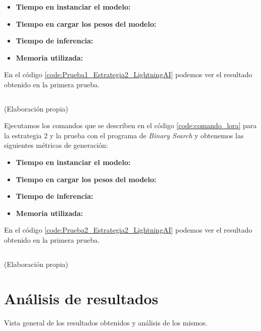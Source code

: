 \begin{itemize}
    \item \textbf{Tiempo en instanciar el modelo:}
    \item \textbf{Tiempo en cargar los pesos del modelo:}
    \item \textbf{Tiempo de inferencia:}
    \item \textbf{Memoria utilizada:}
\end{itemize}

En el código \ref{code:Prueba1_Estrategia2_LightningAI} podemos ver el resultado obtenido
en la primera prueba.

\begin{mycode}
    \begin{verbatim}

    \end{verbatim}
    \caption[]{ (Elaboración propia)}
    \label{code:Prueba1_Estrategia2_LightningAI}
\end{mycode}

Ejecutamos los comandos que se describen en el código \ref{code:comando_lora} para
la estrategia 2 y la prueba con el programa de \textit{Binary Search} y obtenemos
las siguientes métricas de generación:

\begin{itemize}
    \item \textbf{Tiempo en instanciar el modelo:}
    \item \textbf{Tiempo en cargar los pesos del modelo:}
    \item \textbf{Tiempo de inferencia:}
    \item \textbf{Memoria utilizada:}
\end{itemize}

En el código \ref{code:Prueba2_Estrategia2_LightningAI} podemos ver el resultado obtenido
en la primera prueba.

\begin{mycode}
    \begin{verbatim}

    \end{verbatim}
    \caption[]{ (Elaboración propia)}
    \label{code:Prueba2_Estrategia2_LightningAI}
\end{mycode}

\section{Análisis de resultados}
\label{sec:analisis_resultados}

Vista general de los resultados obtenidos y análisis de los mismos.